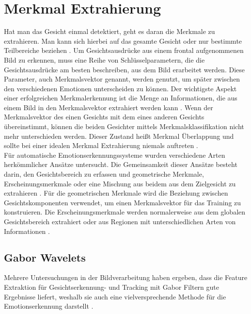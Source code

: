 \documentclass[12pt,a4paper,headinclude,twoside, plainheadsepline, open=right,numbers=noenddot]{scrreprt}
\begin{document}
\section{Merkmal Extrahierung}
Hat man das Gesicht einmal detektiert, geht es daran die Merkmale zu extrahieren. Man kann sich hierbei auf das gesamte Gesicht oder nur bestimmte Teilbereiche beziehen \cite{Fasel2002AutomaticFacialExpressionsAnalysis}. Um Gesichtsausdrücke aus einem frontal aufgenommenen Bild zu erkennen, muss eine Reihe von Schlüsselparametern, die die Gesichtsausdrücke am besten beschreiben, aus dem Bild erarbeitet werden. Diese Parameter, auch Merkmalsvektor genannt, werden genutzt, um später zwischen den verschiedenen Emotionen unterscheiden zu können. Der wichtigste Aspekt einer erfolgreichen Merkmalerkennung ist die Menge an Informationen, die aus einem Bild in den Merkmalsvektor extrahiert werden kann \cite{Shishir2008RecognitionofFacialExpression}. Wenn der Merkmalsvektor des einen Gesichts mit dem eines anderen Gesichts übereinstimmt, können die beiden Gesichter mittels Merkmalsklassifikation nicht mehr unterschieden werden. Dieser Zustand heißt Merkmal Überlappung und sollte bei einer idealen Merkmal Extrahierung niemals auftreten \cite{Shishir2008RecognitionofFacialExpression}.
\\
Für automatische Emotionserkennungssysteme wurden verschiedene Arten herkömmlicher Ansätze untersucht. Die Gemeinsamkeit dieser Ansätze besteht darin, den Gesichtsbereich zu erfassen und geometrische Merkmale, Erscheinungsmerkmale oder eine Mischung aus beidem aus dem Zielgesicht zu extrahieren  \cite{Ko2018FacialEmotionRecognition}. Für die geometrischen Merkmale wird die Beziehung zwischen Gesichtskomponenten verwendet, um einen Merkmalsvektor für das Training zu konstruieren. Die Erscheinungsmerkmale werden normalerweise aus dem globalen Gesichtsbereich extrahiert oder aus Regionen mit unterschiedlichen Arten von Informationen  \cite{Ko2018FacialEmotionRecognition}.

\subsection{Gabor Wavelets}
Mehrere Untersuchungen in der Bildverarbeitung haben ergeben, dass die Feature Extraktion für Gesichtserkennung- und Tracking mit Gabor Filtern gute Ergebnisse liefert, weshalb sie auch eine vielversprechende Methode für die Emotionserkennung darstellt \cite{Shishir2008RecognitionofFacialExpression}.
\end{document}
